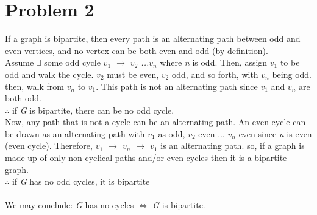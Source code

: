 \documentclass[]{article}
\begin{document}
\section*{Problem 2}
If a graph is bipartite, then every path is an alternating path between odd and even vertices, and no vertex can be both even and odd (by definition). \\
Assume $\exists$ some odd cycle \textit{$v_1$ $\rightarrow$ $v_2$ ...$v_n$} where \textit{n} is odd. Then, assign \textit{$v_1$} to be odd and walk the cycle. \textit{$v_2$} must be even,  \textit{$v_2$} odd, and so forth, with \textit{$v_n$} being odd. then, walk from \textit{$v_n$} to \textit{$v_1$}. This path is not an alternating path since \textit{$v_1$} and \textit{$v_n$} are both odd. \\
$\therefore$ if \textit{G} is bipartite, there can be no odd cycle.\\
Now, any path that is not a cycle can be an alternating path. An even cycle can be drawn as an alternating path with \textit{$v_1$} as odd, \textit{$v_2$} even ... \textit{$v_n$} even since \textit{n} is even (even cycle). Therefore, \textit{$v_1$ $\rightarrow$ $v_n$ $\rightarrow$ $v_1$} is an alternating path. so, if a graph is made up of only non-cyclical paths and/or even cycles then it is a bipartite graph. \\
$\therefore$ if \textit{G} has no odd cycles, it is bipartite\\
\\
We may conclude: \textit{G} has no cycles $\Leftrightarrow$ \textit{G} is bipartite.
\end{document}
